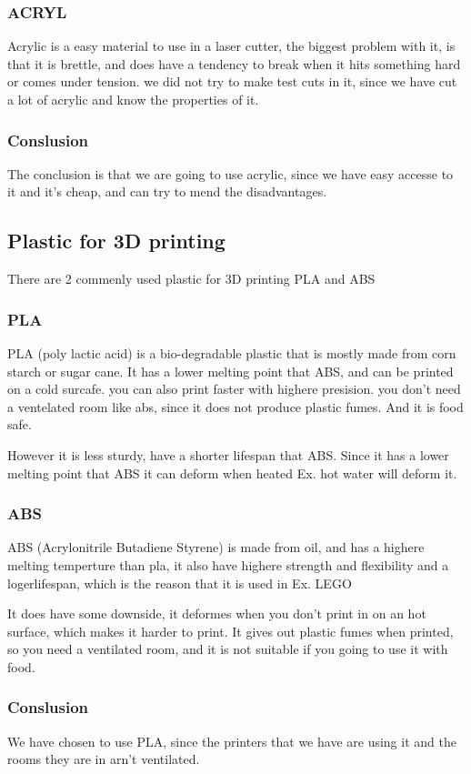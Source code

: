 \subsubsection{ACRYL}
Acrylic is a easy material to use in a laser cutter, the biggest problem with it, is that it is brettle, and does have a tendency to break when it hits something hard or comes under tension.
we did not try to make test cuts in it, since we have cut a lot of acrylic and know the properties of it.


\subsubsection{Conslusion}
The conclusion is that we are going to use acrylic, since we have easy accesse to it and it's cheap, and can try to mend the disadvantages.

\subsection{Plastic for 3D printing}
There are 2 commenly used plastic for 3D printing PLA and ABS \cite{PLAABS}

\subsubsection{PLA}
PLA (poly lactic acid) is a bio-degradable plastic that is mostly made from corn starch or sugar cane.
It has a lower melting point that ABS, and can be printed on a cold surcafe. you can also print faster with highere presision. you don't need a ventelated room like abs, since it does not produce plastic fumes. And it is food safe.

However it is less sturdy, have a shorter lifespan that ABS. Since it has a lower melting point that ABS it can deform when heated Ex. hot water will deform it.

\subsubsection{ABS}
ABS (Acrylonitrile Butadiene Styrene) is made from oil, and has a highere melting temperture than pla, it also have highere strength and flexibility and a logerlifespan, which is the reason that it is used in Ex. LEGO

It does have some downside, it deformes when you don't print in on an hot surface, which makes it harder to print. It gives out plastic fumes when printed, so you need a ventilated room, and it is not suitable if you going to use it with food.

\subsubsection{Conslusion}
We have chosen to use PLA, since the printers that we have are using it and the rooms they are in arn't ventilated.

